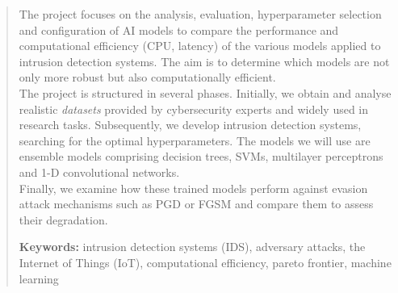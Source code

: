\documentclass[12pt,a4paper,twoside,openright]{book}
\begin{document}
\renewcommand{\abstractname}{Abstract}
\begin{abstract}

The project focuses on the analysis, evaluation, hyperparameter selection and configuration of AI models to compare the performance and computational efficiency (CPU, latency) of the various models applied to intrusion detection systems. 
The aim is to determine which models are not only more robust but also computationally efficient. \\

The project is structured in several phases. Initially, we obtain and analyse realistic \textit{datasets} provided by cybersecurity experts and widely used in research tasks.
Subsequently, we develop intrusion detection systems, searching for the optimal hyperparameters. The models we will use are ensemble models comprising decision trees, SVMs, multilayer perceptrons and 1-D convolutional networks. \\

Finally, we examine how these trained models perform against evasion attack mechanisms such as PGD or FGSM and compare them to assess their degradation.

\medskip
\noindent\textbf{Keywords:} 
intrusion detection systems (IDS), adversary attacks, the Internet of Things (IoT), computational efficiency, pareto frontier, machine learning
\end{abstract}



\clearpage
\tableofcontents
\clearpage
\listoffigures
\clearpage
\listoftables
\clearpage
\listofalgorithms     
\clearpage

\renewcommand{\nomname}{Lista de acrónimos}
\printnomenclature
\clearpage 
\end{document}

